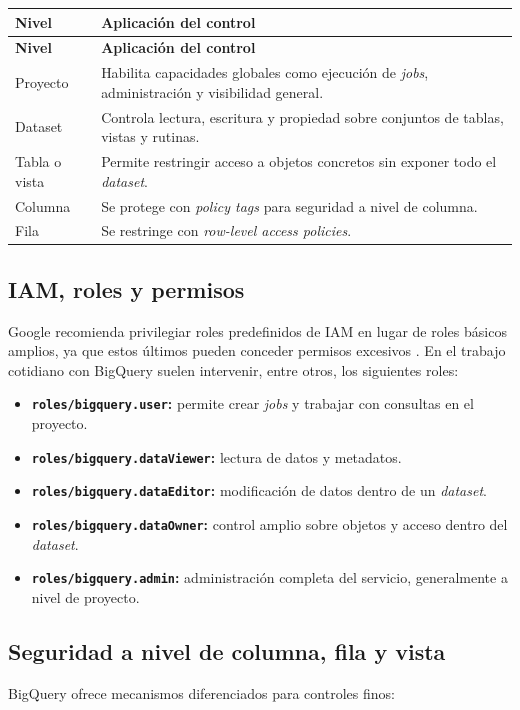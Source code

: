 \documentclass[12pt]{article}
\begin{document}
\begin{longtable}{@{}p{}p{}@{}}
\toprule
\textbf{Nivel} & \textbf{Aplicación del control} \\
\midrule
\endfirsthead
\toprule
\textbf{Nivel} & \textbf{Aplicación del control} \\
\midrule
\endhead
Proyecto & Habilita capacidades globales como ejecución de \textit{jobs}, administración y visibilidad general. \\
Dataset & Controla lectura, escritura y propiedad sobre conjuntos de tablas, vistas y rutinas. \\
Tabla o vista & Permite restringir acceso a objetos concretos sin exponer todo el \textit{dataset}. \\
Columna & Se protege con \textit{policy tags} para seguridad a nivel de columna. \\
Fila & Se restringe con \textit{row-level access policies}. \\
\bottomrule
\end{longtable}

\subsection{IAM, roles y permisos}
Google recomienda privilegiar roles predefinidos de IAM en lugar de roles básicos amplios, ya que estos últimos pueden conceder permisos excesivos \cite{gcp_bigquery_basic_roles}. En el trabajo cotidiano con BigQuery suelen intervenir, entre otros, los siguientes roles:

\begin{itemize}[leftmargin=*]
\item \textbf{\texttt{roles/bigquery.user}:} permite crear \textit{jobs} y trabajar con consultas en el proyecto.
\item \textbf{\texttt{roles/bigquery.dataViewer}:} lectura de datos y metadatos.
\item \textbf{\texttt{roles/bigquery.dataEditor}:} modificación de datos dentro de un \textit{dataset}.
\item \textbf{\texttt{roles/bigquery.dataOwner}:} control amplio sobre objetos y acceso dentro del \textit{dataset}.
\item \textbf{\texttt{roles/bigquery.admin}:} administración completa del servicio, generalmente a nivel de proyecto.
\end{itemize}

\subsection{Seguridad a nivel de columna, fila y vista}
BigQuery ofrece mecanismos diferenciados para controles finos:
\end{document}
